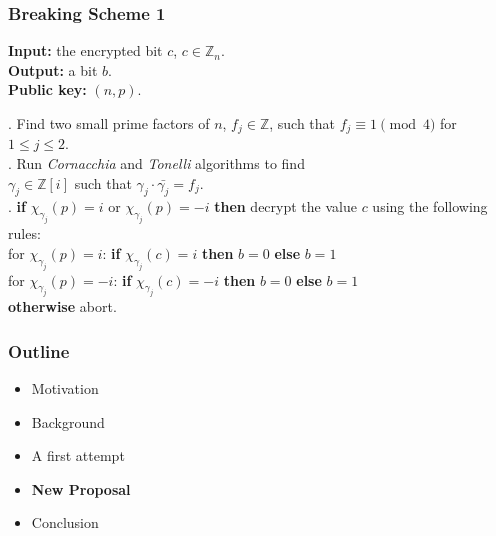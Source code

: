 \documentclass{beamer}
\begin{document}


\begin{frame}
\frametitle{Breaking Scheme 1}
 
     \textbf{Input:} the encrypted bit $c$, $c \in \mathbb{Z}_n$. \\
 		    			 \textbf{Output:} a bit $b$.\\
 		    			 \textbf{Public key:} $(n,p)$.
 		    	\bigskip
 		    	
 		    	
 		    	. Find two small prime factors of $n$, $f_j \in \mathbb{Z}$, such that $f_j \equiv 1 \pmod{4}$ for $1 \leq j \leq 2$.  \\
 		        . Run \textit{Cornacchia} and \textit{Tonelli} algorithms to find  \\
 		        \quad \quad $\gamma_j \in \mathbb{Z}[i]$ such that $\gamma_j \cdot \bar{\gamma_j} = f_j$. \\
 		         . \textbf{if} $\chi_{\gamma_j} (p) =i$ or $\chi_{\gamma_j} (p) = -i$ \textbf{then} decrypt the value $c$ using the following rules:  \\
 		         \quad \quad for $\chi_{\gamma_j} (p) =i$:  \textbf{if} $\chi_{\gamma_j} (c) =i$ \textbf{then} $b=0$ \textbf{else} $b=1$ \\
 		         \quad \quad for $\chi_{\gamma_j} (p) = -i$:  \textbf{if} $\chi_{\gamma_j} (c) = -i$ \textbf{then} $b=0$ \textbf{else} $b=1$ \\ 
 		         \quad \quad \textbf{otherwise} abort. 
  
\end{frame}


\begin{frame}
\frametitle{Outline}

 	\begin{itemize}
		\item Motivation 
		\item Background
		\item A first attempt
		\item \textbf{New Proposal}
		\item Conclusion
	\end{itemize}
\end{frame}

\end{document}
